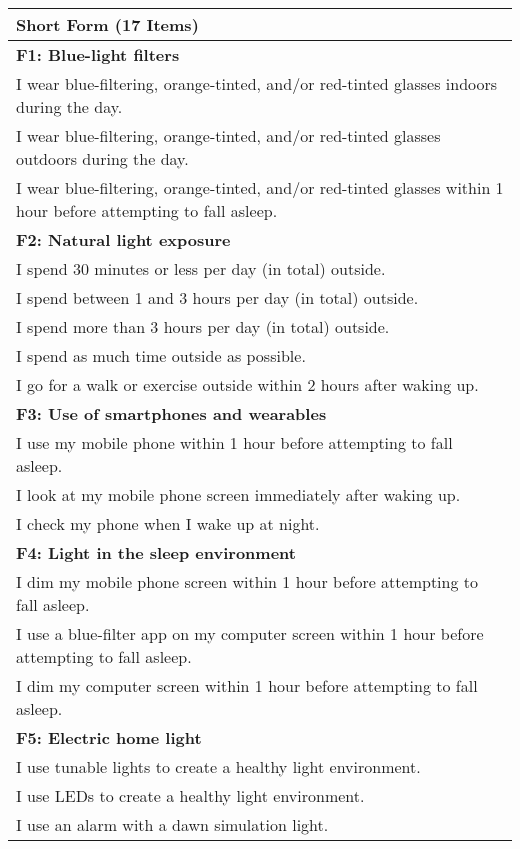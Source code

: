 \documentclass[
  english,
  man,floatsintext]{apa6}
\begin{document}
\begin{longtable}[]{@{}
  >{\raggedright\arraybackslash}p{}@{}}
\toprule
Short Form (17 Items) \\
\midrule
\endhead
\textbf{F1: Blue-light filters} \\
I wear blue-filtering, orange-tinted, and/or red-tinted glasses indoors during the day. \\
I wear blue-filtering, orange-tinted, and/or red-tinted glasses outdoors during the day. \\
I wear blue-filtering, orange-tinted, and/or red-tinted glasses within 1 hour before attempting to fall asleep. \\
\textbf{F2: Natural light exposure} \\
I spend 30 minutes or less per day (in total) outside. \\
I spend between 1 and 3 hours per day (in total) outside. \\
I spend more than 3 hours per day (in total) outside. \\
I spend as much time outside as possible. \\
I go for a walk or exercise outside within 2 hours after waking up. \\
\textbf{F3: Use of smartphones and wearables} \\
I use my mobile phone within 1 hour before attempting to fall asleep. \\
I look at my mobile phone screen immediately after waking up. \\
I check my phone when I wake up at night. \\
\textbf{F4: Light in the sleep environment} \\
I dim my mobile phone screen within 1 hour before attempting to fall asleep. \\
I use a blue-filter app on my computer screen within 1 hour before attempting to fall asleep. \\
I dim my computer screen within 1 hour before attempting to fall asleep. \\
\textbf{F5: Electric home light} \\
I use tunable lights to create a healthy light environment. \\
I use LEDs to create a healthy light environment. \\
I use an alarm with a dawn simulation light. \\
\bottomrule
\end{longtable}
\end{document}
